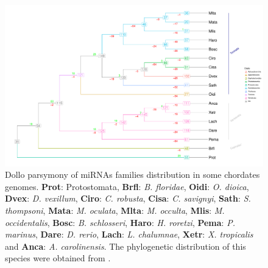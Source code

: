 \documentclass[graybox]{svmult}
\begin{document}
\begin{figure}[t]
\sidecaption[t]
\includegraphics[width=\textwidth]{./Images/last_tree_miRNAs}
\caption{Dollo parsymony of miRNAs families distribution in some 
chordates genomes. \textbf{Prot}: Protostomata, \textbf{Brfl}: \textit{B. floridae},
\textbf{Oidi}: \textit{O. dioica}, \textbf{Dvex}: \textit{D. vexillum},
\textbf{Ciro}: \textit{C. robusta}, \textbf{Cisa}: \textit{C. savignyi}, \textbf{Sath}: \textit{S. thompsoni},
\textbf{Mata}: \textit{M. oculata}, \textbf{Mlta}: \textit{M. occulta},
\textbf{Mlis}: \textit{M. occidentalis}, \textbf{Bosc}: \textit{B. schlosseri},
\textbf{Haro}: \textit{H. roretzi}, \textbf{Pema}: \textit{P. marinus},
\textbf{Dare}: \textit{D. rerio}, \textbf{Lach}: \textit{L. chalumnae},
\textbf{Xetr}: \textit{X. tropicalis} and \textbf{Anca}: \textit{A.
carolinensis}. The phylogenetic distribution of this species were obtained from \cite{Delsuc:2017, Kocot:2018}.}
\label{fig:dollotree}
\end{figure}


\end{document}
